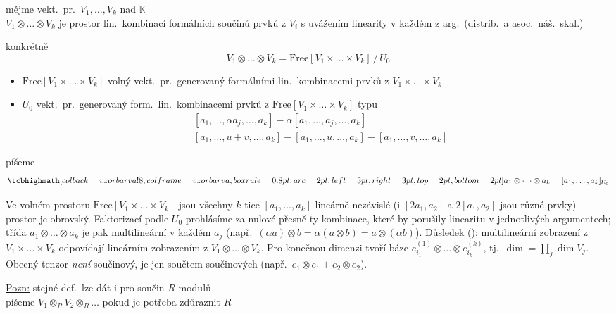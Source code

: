 \begin{definice}
mějme vekt.\ pr.\ $V_1,\dots,V_k$ nad $\mathbb{K}$ \\
 $V_1\otimes\dots\otimes V_k$ je prostor lin.\ kombinací formálních součinů prvků z $V_i$ s uvážením linearity v každém z arg.\ (distrib.\ a asoc.\ náš.\ skal.)

konkrétně
\[
  V_1\otimes\dots\otimes V_k = \mathrm{Free}[V_1\times\dots\times V_k]\,/\,U_0
\]
\begin{itemize}[nosep]
  \item[] $\mathrm{Free}[V_1\times\dots\times V_k]$ \quad volný vekt.\ pr.\ generovaný formálními lin.\ kombinacemi prvků z $V_1\times\dots\times V_k$
  \item[] $U_0$ \quad vekt.\ pr.\ generovaný form.\ lin.\ kombinacemi prvků z $\mathrm{Free}[V_1\times\dots\times V_k]$ typu
  \begin{align*}
    &[a_1,\dots,\alpha a_j,\dots,a_k] - \alpha[a_1,\dots,a_j,\dots,a_k] \\
    &[a_1,\dots,u+v,\dots,a_k] - [a_1,\dots,u,\dots,a_k] - [a_1,\dots,v,\dots,a_k]
  \end{align*}
\end{itemize}
píšeme
\[
  \vzorec{a_1\otimes\dots\otimes a_k = [a_1,\dots,a_k]_{U_0}}
\]
\end{definice}

\begin{vysvetleni}
Ve volném prostoru $\mathrm{Free}[V_1\times\dots\times V_k]$ jsou všechny $k$-tice $[a_1,\dots,a_k]$ lineárně nezávislé (i $[2a_1,a_2]$ a $2[a_1,a_2]$ jsou různé prvky) -- prostor je obrovský. Faktorizací podle $U_0$ prohlásíme za nulové přesně ty kombinace, které by porušily linearitu v jednotlivých argumentech; třída $a_1\otimes\dots\otimes a_k$ je pak multilineární v každém $a_j$ (např.\ $(\alpha a)\otimes b=\alpha(a\otimes b)=a\otimes(\alpha b)$). Důsledek (): multilineární zobrazení z $V_1\times\dots\times V_k$ odpovídají lineárním zobrazením z $V_1\otimes\dots\otimes V_k$. Pro konečnou dimenzi tvoří báze $e^{(1)}_{i_1}\otimes\dots\otimes e^{(k)}_{i_k}$, tj.\ $\dim = \prod_j\dim V_j$. Obecný tenzor \emph{není} součinový, je jen součtem součinových (např.\ $e_1\otimes e_1+e_2\otimes e_2$).
\end{vysvetleni}

\underline{Pozn:} stejné def.\ lze dát i pro součin $R$-modulů \\
\quad píšeme $V_1\otimes_R V_2\otimes_R\dots$ \quad pokud je potřeba zdůraznit $R$

